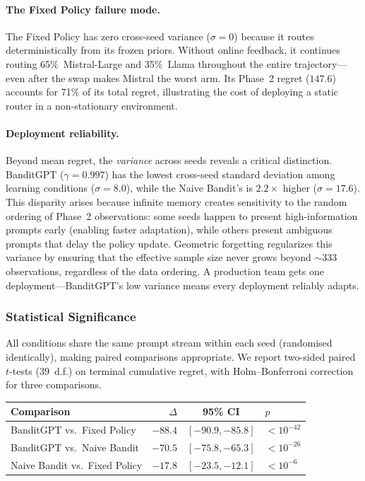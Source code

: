 \paragraph{The Fixed Policy failure mode.}
The Fixed Policy has zero cross-seed variance ($\sigma{=}0$)
because it routes deterministically from its frozen priors.
Without online feedback, it continues routing 65\%~Mistral-Large
and 35\%~Llama throughout the entire trajectory---even after
the swap makes Mistral the worst arm.
Its Phase~2 regret ($147.6$) accounts for 71\% of its total regret,
illustrating the cost of deploying a static router in a
non-stationary environment.

\paragraph{Deployment reliability.}
Beyond mean regret, the \emph{variance} across seeds reveals a
critical distinction.
BanditGPT ($\gamma{=}0.997$) has the lowest cross-seed standard
deviation among learning conditions ($\sigma{=}8.0$), while
the Naive Bandit's is $2.2\times$ higher ($\sigma{=}17.6$).
This disparity arises because infinite memory creates sensitivity
to the random ordering of Phase~2 observations: some seeds happen
to present high-information prompts early (enabling faster
adaptation), while others present ambiguous prompts that delay
the policy update.
Geometric forgetting regularizes this variance by ensuring that
the effective sample size never grows beyond ${\sim}333$
observations, regardless of the data ordering.
A production team gets one deployment---BanditGPT's low variance
means every deployment reliably adapts.


\subsubsection{Statistical Significance}
\label{sec:nonstat_significance}

All conditions share the same prompt stream within each seed
(randomised identically), making paired comparisons appropriate.
We report two-sided paired $t$-tests (39~d.f.) on terminal
cumulative regret, with Holm--Bonferroni
correction~\cite{holm1979simple} for three comparisons.

\begin{center}
\small
\begin{tabular}{@{}lrcl@{}}
\toprule
\textbf{Comparison} & \textbf{$\Delta$} & \textbf{95\% CI} & \textbf{$p$} \\
\midrule
BanditGPT vs.\ Fixed Policy & $-88.4$ & $[-90.9, -85.8]$ & $< 10^{-42}$ \\
BanditGPT vs.\ Naive Bandit & $-70.5$ & $[-75.8, -65.3]$ & $< 10^{-26}$ \\
Naive Bandit vs.\ Fixed Policy & $-17.8$ & $[-23.5, -12.1]$ & $< 10^{-6}$ \\
\bottomrule
\end{tabular}
\end{center}

